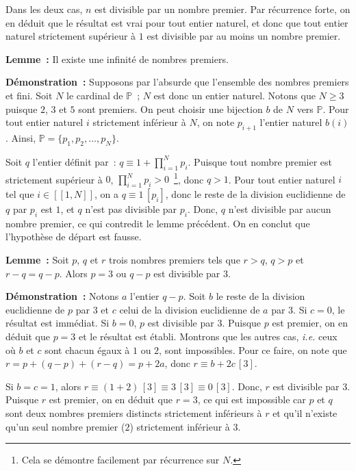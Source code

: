 Dans les deux cas, $n$ est divisible par un nombre premier. 
Par récurrence forte, on en déduit que le résultat est vrai pour tout entier naturel, et donc que tout entier naturel strictement supérieur à $1$ est divisible par au moins un nombre premier.

\done

\bigskip

\noindent\textbf{Lemme :} Il existe une infinité de nombres premiers.

\medskip

\noindent\textbf{Démonstration :} Supposons par l'absurde que l'ensemble des nombres premiers et fini. 
Soit $N$ le cardinal de $\mathbb{P}$ ; $N$ est donc un entier naturel. 
Notons que $N \geq 3$ puisque $2$, $3$ et $5$ sont premiers.
On peut choisir une bijection $b$ de $N$ vers $\mathbb{P}$. 
Pour tout entier naturel $i$ strictement inférieur à $N$, on note $p_{i+1}$ l'entier naturel $b(i)$.
Ainsi, $\mathbb{P} = \lbrace p_1, p_2, \dots, p_N \rbrace$. 

Soit $q$ l'entier définit par : $q \equiv 1 + \prod_{i=1}^N p_i$. 
Puisque tout nombre premier est strictement supérieur à $0$, $\prod_{i=1}^N p_i > 0$~\footnote{Cela se démontre facilement par récurrence sur $N$.}, donc $q > 1$.
Pour tout entier naturel $i$ tel que $i \in [\![1, N]\!]$, on a $q \equiv 1 \, [p_i]$, donc le reste de la division euclidienne de $q$ par $p_i$ est $1$, et $q$ n'est pas divisible par $p_i$.  
Donc, $q$ n'est divisible par aucun nombre premier, ce qui contredit le lemme précédent. 
On en conclut que l'hypothèse de départ est fausse. 

\done

\bigskip

\noindent\textbf{Lemme :} Soit $p$, $q$ et $r$ trois nombres premiers tels que $r > q$, $q > p$ et $r-q = q-p$. Alors $p=3$ ou $q-p$ est divisible par $3$.

\medskip

\noindent\textbf{Démonstration :} Notons $a$ l'entier $q-p$. 
Soit $b$ le reste de la division euclidienne de $p$ par $3$ et $c$ celui de la division euclidienne de $a$ par $3$. 
Si $c = 0$, le résultat est immédiat.
Si $b = 0$, $p$ est divisible par $3$. 
Puisque $p$ est premier, on en déduit que $p=3$ et le résultat est établi. 
Montrons que les autres cas, \textit{i.e.} ceux où $b$ et $c$ sont chacun égaux à $1$ ou $2$, sont impossibles. 
Pour ce faire, on note que $r = p + (q - p) + (r - q) = p + 2 a$, donc $r \equiv b + 2 c \, [3]$.

Si $b = c = 1$, alors $r \equiv (1 + 2) \, [3] \equiv 3 \, [3] \equiv 0 \, [3]$. 
Donc, $r$ est divisible par $3$. 
Puisque $r$ est premier, on en déduit que $r=3$, ce qui est impossible car $p$ et $q$ sont deux nombres premiers distincts strictement inférieurs à $r$ et qu'il n'existe qu'un seul nombre premier ($2$) strictement inférieur à $3$. 

